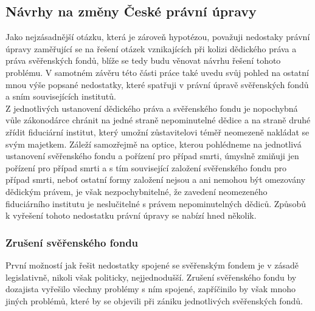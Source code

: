 \documentclass{article}
\begin{document}



\subsection{Návrhy na změny České právní úpravy}

Jako nejzásadnější otázku, která je zároveň hypotézou, považuji nedostaky právní úpravy zaměřující se na řešení otázek vznikajících při kolizi dědického práva a práva svěřenských fondů, blíže se tedy budu věnovat návrhu řešení tohoto problému. V samotném závěru této části práce také uvedu svůj pohled na ostatní mnou výše popsané nedostatky, které spatřuji v právní úpravě svěřenských fondů a sním souvisejících institutů.\\

Z jednotlivých ustanovení dědického práva a svěřenského fondu je nopochybná vůle zákonodárce chránit na jedné straně nepominutelné dědice a na straně druhé zřídit fiduciární institut, který umožní zůstavitelovi téměř neomezeně nakládat se svým majetkem. Záleží samozřejmě na optice, kterou pohlédneme na jednotlivá ustanovení svěřenského fondu a pořízení pro případ smrti, úmyslně zmiňuji jen pořízení pro případ smrti a s tím související založení svěřenského fondu pro případ smrti, neboť ostatní formy založení nejsou a ani nemohou být omezovány dědickým právem, je však nezpochybnitelné, že zavedení neomezeného fiduciárního institutu je neslučitelné s právem nepominutelných dědiců. Způsobů k vyřešení tohoto nedostatku právní úpravy se nabízí hned několik.\\

\subsubsection{Zrušení svěřenského fondu}

První možností jak řešit nedostatky spojené se svěřenským fondem je v zásadě legislativně, nikoli však politicky, nejjednodušší. Zrušení svěřenského fondu by dozajista vyřešilo všechny problémy s ním spojené, zapříčinilo by však mnoho jiných problémů, které by se objevili při zániku jednotlivých svěřenských fondů.\\
\end{document}
